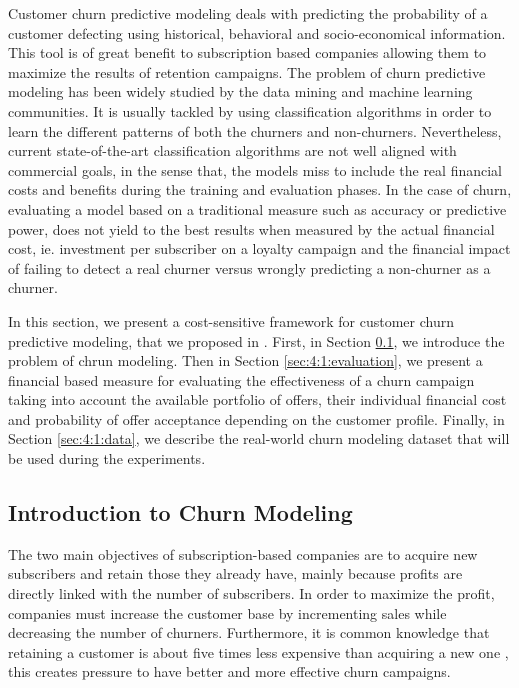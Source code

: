 Customer churn predictive modeling deals with predicting the probability of a customer defecting 
using historical, behavioral and socio-economical information. This tool is of great benefit to 
subscription based companies allowing them to maximize the results of retention campaigns. The 
problem of churn predictive modeling has been widely studied by the data mining and machine learning
communities. It is usually tackled by using classification algorithms in order to learn the 
different patterns of both the churners and non-churners. Nevertheless, current state-of-the-art 
classification algorithms are not well aligned with commercial goals, in the sense that, the models 
miss to include the real financial costs and benefits during the training and evaluation phases. In 
the case of churn, evaluating a model based on a traditional measure such as accuracy or predictive 
power, does not yield to the best results when measured by the actual financial cost, ie. 
investment per subscriber on a loyalty campaign and the financial impact of failing to detect a 
real churner versus wrongly predicting a non-churner as a churner.

In this section, we present a cost-sensitive framework for customer churn predictive modeling, 
that we proposed in \citep{CorreaBahnsen2015a}. First, in Section \ref{sec:4:1:intro}, we introduce 
the problem of chrun modeling. Then in Section \ref{sec:4:1:evaluation}, we present a financial 
based measure for evaluating the effectiveness of a churn campaign taking into account the available 
portfolio of offers, their individual financial cost and probability of offer acceptance depending 
on the customer profile. Finally, in Section \ref{sec:4:1:data}, we describe the real-world churn 
modeling dataset that will be used during the experiments.


\subsection{Introduction to Churn Modeling}
\label{sec:4:1:intro}

The two main objectives of subscription-based companies are to  acquire new subscribers and 
retain those they already have, mainly because profits are directly linked with the number of 
subscribers.  In order to maximize the profit, companies must increase the customer base by 
incrementing sales  while decreasing the number of churners. Furthermore, it is common knowledge 
that retaining a  customer is about five times less expensive than acquiring a new one 
\citep{Farris2010}, this creates  pressure to have better and more effective churn campaigns.

